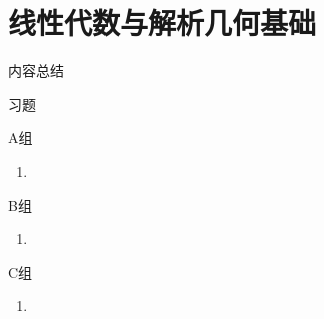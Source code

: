 \chapter{线性代数与解析几何基础}

\vspace{2ex} 
\centerline{\heiti \Large 内容总结}

\vspace{2ex} 

\centerline{\heiti \Large 习题}
\vspace{2ex} 
{\kaishu }
\begin{flushright}
    \kaishu

\end{flushright}
\centerline{\heiti A组}
\begin{enumerate}
	\item 
\end{enumerate}
\centerline{\heiti B组}
\begin{enumerate}
	\item 
\end{enumerate}
\centerline{\heiti C组}
\begin{enumerate}
	\item 
\end{enumerate}